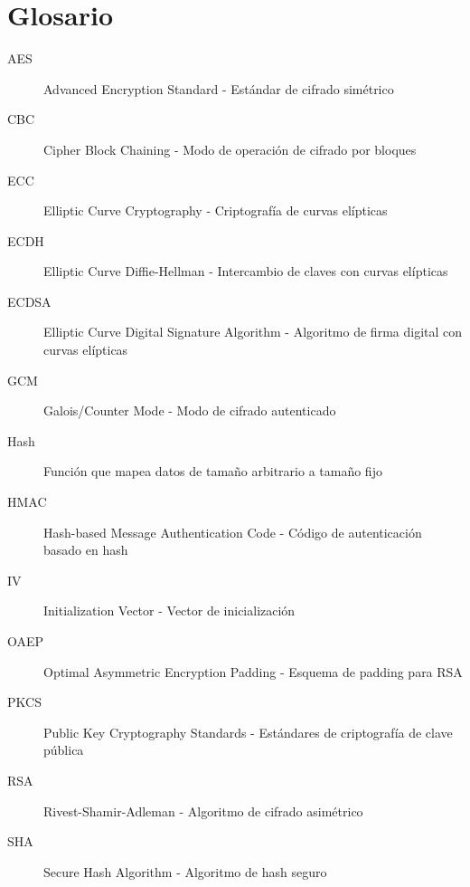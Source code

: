 \documentclass[12pt,a4paper]{article}
\begin{document}
\section{Glosario}

\begin{description}
    \item[AES] Advanced Encryption Standard - Estándar de cifrado simétrico
    \item[CBC] Cipher Block Chaining - Modo de operación de cifrado por bloques
    \item[ECC] Elliptic Curve Cryptography - Criptografía de curvas elípticas
    \item[ECDH] Elliptic Curve Diffie-Hellman - Intercambio de claves con curvas
          elípticas
    \item[ECDSA] Elliptic Curve Digital Signature Algorithm - Algoritmo de firma digital
          con curvas elípticas
    \item[GCM] Galois/Counter Mode - Modo de cifrado autenticado
    \item[Hash] Función que mapea datos de tamaño arbitrario a tamaño fijo
    \item[HMAC] Hash-based Message Authentication Code - Código de autenticación basado
          en hash
    \item[IV] Initialization Vector - Vector de inicialización
    \item[OAEP] Optimal Asymmetric Encryption Padding - Esquema de padding para RSA
    \item[PKCS] Public Key Cryptography Standards - Estándares de criptografía de clave
          pública
    \item[RSA] Rivest-Shamir-Adleman - Algoritmo de cifrado asimétrico
    \item[SHA] Secure Hash Algorithm - Algoritmo de hash seguro
\end{description}
\end{document}
